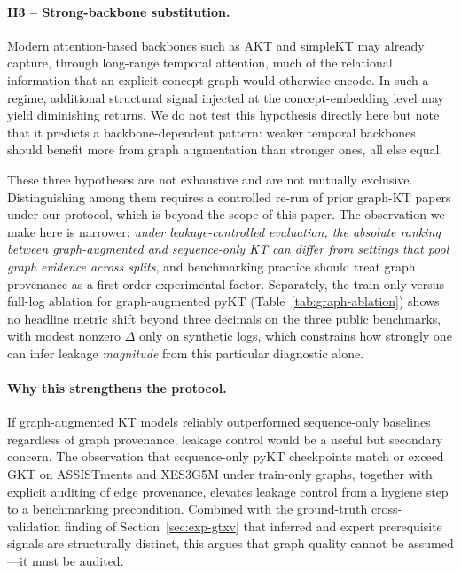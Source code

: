 \documentclass[runningheads]{llncs}
\begin{document}
\paragraph{H3 -- Strong-backbone substitution.}
Modern attention-based backbones such as AKT and simpleKT may already
capture, through long-range temporal attention, much of the relational
information that an explicit concept graph would otherwise encode. In
such a regime, additional structural signal injected at the
concept-embedding level may yield diminishing returns. We do not test
this hypothesis directly here but note that it predicts a
backbone-dependent pattern: weaker temporal backbones should benefit
more from graph augmentation than stronger ones, all else equal.

These three hypotheses are not exhaustive and are not mutually
exclusive. Distinguishing among them requires a controlled re-run of
prior graph-KT papers under our protocol, which is beyond the scope
of this paper. The observation we make here is narrower:
\emph{under leakage-controlled evaluation, the absolute ranking between
graph-augmented and sequence-only KT can differ from settings that pool graph
evidence across splits}, and benchmarking practice should treat graph provenance
as a first-order experimental factor.
Separately, the train-only versus full-log ablation for graph-augmented pyKT
(Table~\ref{tab:graph-ablation}) shows no headline metric shift beyond three decimals
on the three public benchmarks, with modest nonzero $\Delta$ only on synthetic logs,
which constrains how strongly one can infer leakage \emph{magnitude} from this
particular diagnostic alone.

\paragraph{Why this strengthens the protocol.}
If graph-augmented KT models reliably outperformed sequence-only
baselines regardless of graph provenance, leakage control would be a
useful but secondary concern.
The observation that sequence-only pyKT checkpoints match or exceed GKT on
ASSISTments and XES3G5M under train-only graphs, together with explicit auditing of edge
provenance, elevates leakage control from a hygiene step to a benchmarking
precondition.
Combined with the ground-truth cross-validation finding of Section~\ref{sec:exp-gtxv}
that inferred and expert prerequisite signals are structurally
distinct, this argues that graph quality cannot be assumed---it must
be audited.
\end{document}
